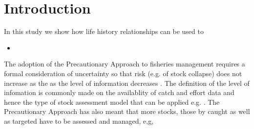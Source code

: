 \documentclass[preprint,authoryear,12pt]{elsarticle}
\begin{document}
\begin{frontmatter}



\title{}


\author{}

\address{}

\begin{abstract}


\end{abstract}

\begin{keyword}


\end{keyword}

\end{frontmatter}


\section{Introduction}
\label{Introduction}

In this study we show how life history relationships can be used to 

\begin{itemize}
 \item 
\end{itemize}

The adoption of the Precautionary Approach to fisheries management \citep{garcia1996precautionary}
requires a formal consideration of uncertainty so that risk (e.g. of stock collapse)  does not increase 
as the as the level of information decreases \citep{cooke1999improvement}. The definition of the level 
of infomation is commonly made on the availablity of catch and effort data and hence the type of stock 
assessment model that can be applied e.g. \cite{smith2008experience}. The Precautionary Approach has also meant
that more stocks, those by caught as well as targeted have to be assessed and managed, e,g, \cite{walker2011ecological}
\end{document}
